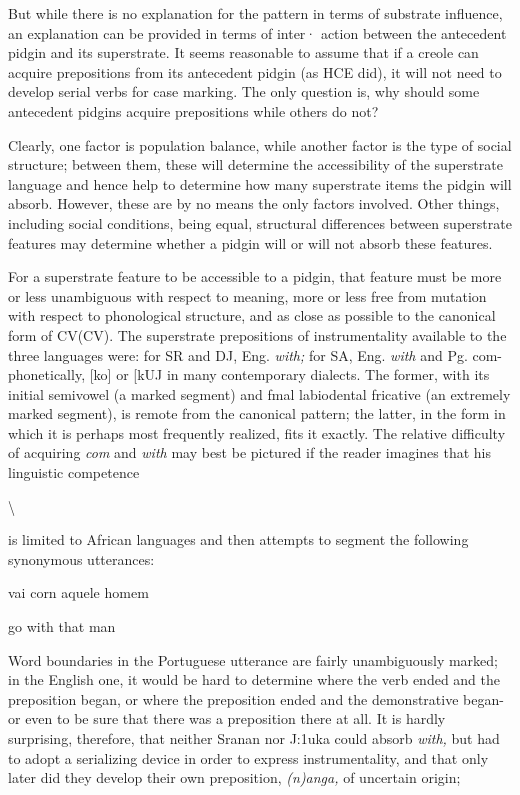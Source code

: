 But while there is no explanation for the pattern in terms of substrate influence, an explanation can be provided in terms of inter· action between the antecedent pidgin and its superstrate. It seems reasonable to assume that if a creole can acquire prepositions from its antecedent pidgin (as HCE did), it will not need to develop serial verbs for case marking. The only question is, why should some antecedent pidgins acquire prepositions while others do not?

Clearly, one factor is population balance, while another factor is the type of social structure; between them, these will determine the accessibility of the superstrate language and hence help to deter\-mine how many superstrate items the pidgin will absorb. However, these are by no means the only factors involved. Other things, including social conditions, being equal, structural differences between super\-strate features may determine whether a pidgin will or will not absorb these features.

For a superstrate feature to be accessible to a pidgin, that feature must be more or less unambiguous with respect to meaning, more or less free from mutation with respect to phonological structure, and as close as possible to the canonical form of CV(CV). The superstrate prepositions of instrumentality available to the three languages were: for SR and DJ, Eng. \textit{with;} for SA, Eng. \textit{with} and Pg. com-phonetically, [ko] or [kUJ in many contemporary dialects. The former, with its initial semivowel (a marked segment) and fmal labiodental fricative (an extremely marked segment), is remote from the canonical pattern; the latter, in the form in which it is perhaps most frequently realized, fits it exactly. The relative difficulty of acquiring \textit{com} and \textit{with} may best be pictured if the reader imagines that his linguistic competence

{\textbackslash}


is limited to African languages and then attempts to segment the following synonymous utterances:

\ea\label{ex:234}
 vai corn aquele homem
\glt
\z

\ea\label{ex:235}
 go with that man
\glt
\z

Word boundaries in the Portuguese utterance are fairly un\-ambiguously marked; in the English one, it would be hard to determine where the verb ended and the preposition began, or where the preposi\-tion ended and the demonstrative began-or even to be sure that there was a preposition there at all. It is hardly surprising, therefore, that neither Sranan nor J:1uka could absorb \textit{with,} but had to adopt a serializ\-ing device in order to express instrumentality, and that only later did they develop their own preposition, \textit{(n}\textit{)}\textit{a}\textit{n}\textit{ga, }of uncertain origin;

